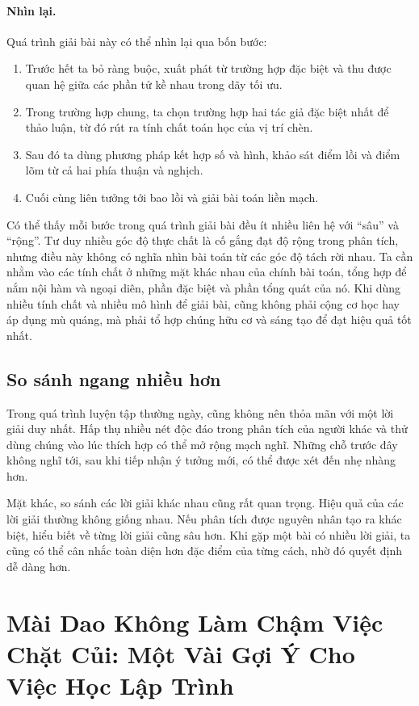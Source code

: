 \documentclass[11pt]{article}
\begin{document}
\paragraph{Nhìn lại.}
Quá trình giải bài này có thể nhìn lại qua bốn bước:
\begin{enumerate}
  \item Trước hết ta bỏ ràng buộc, xuất phát từ trường hợp đặc biệt và thu
  được quan hệ giữa các phần tử kề nhau trong dãy tối ưu.
  \item Trong trường hợp chung, ta chọn trường hợp hai tác giả đặc biệt nhất
  để thảo luận, từ đó rút ra tính chất toán học của vị trí chèn.
  \item Sau đó ta dùng phương pháp kết hợp số và hình, khảo sát điểm lồi và
  điểm lõm từ cả hai phía thuận và nghịch.
  \item Cuối cùng liên tưởng tới bao lồi và giải bài toán liền mạch.
\end{enumerate}

Có thể thấy mỗi bước trong quá trình giải bài đều ít nhiều liên hệ với
``sâu'' và ``rộng''. Tư duy nhiều góc độ thực chất là cố gắng đạt độ rộng
trong phân tích, nhưng điều này không có nghĩa nhìn bài toán từ các góc độ
tách rời nhau. Ta cần nhằm vào các tính chất ở những mặt khác nhau của chính
bài toán, tổng hợp để nắm nội hàm và ngoại diên, phần đặc biệt và phần tổng
quát của nó. Khi dùng nhiều tính chất và nhiều mô hình để giải bài, cũng
không phải cộng cơ học hay áp dụng mù quáng, mà phải tổ hợp chúng hữu cơ và
sáng tạo để đạt hiệu quả tốt nhất.

\subsection{So sánh ngang nhiều hơn}

Trong quá trình luyện tập thường ngày, cũng không nên thỏa mãn với một lời
giải duy nhất. Hấp thụ nhiều nét độc đáo trong phân tích của người khác và
thử dùng chúng vào lúc thích hợp có thể mở rộng mạch nghĩ. Những chỗ trước
đây không nghĩ tới, sau khi tiếp nhận ý tưởng mới, có thể được xét đến nhẹ
nhàng hơn.

Mặt khác, so sánh các lời giải khác nhau cũng rất quan trọng. Hiệu quả của các
lời giải thường không giống nhau. Nếu phân tích được nguyên nhân tạo ra khác
biệt, hiểu biết về từng lời giải cũng sâu hơn. Khi gặp một bài có nhiều lời
giải, ta cũng có thể cân nhắc toàn diện hơn đặc điểm của từng cách, nhờ đó
quyết định dễ dàng hơn.

\section{Mài Dao Không Làm Chậm Việc Chặt Củi: Một Vài Gợi Ý Cho Việc Học Lập Trình}
\end{document}
